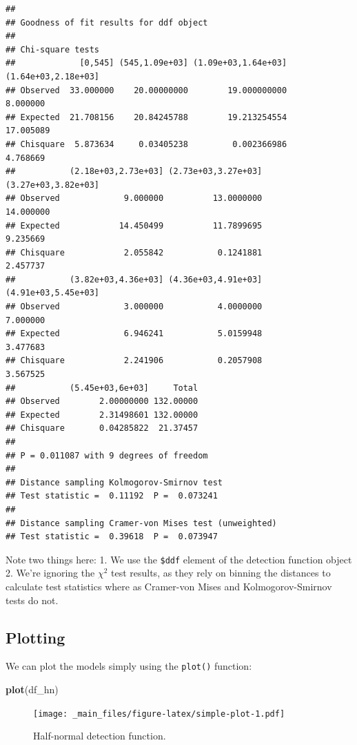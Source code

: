 \documentclass[]{book}
\newenvironment{Shaded}{\begin{snugshade}}{\end{snugshade}}
\newcommand{\KeywordTok}[1]{\textcolor[rgb]{0.13,0.29,0.53}{\textbf{#1}}}
\newcommand{\NormalTok}[1]{#1}
\theoremstyle{definition}
\theoremstyle{definition}
\theoremstyle{remark}
\begin{document}
\begin{verbatim}
## 
## Goodness of fit results for ddf object
## 
## Chi-square tests
##             [0,545] (545,1.09e+03] (1.09e+03,1.64e+03] (1.64e+03,2.18e+03]
## Observed  33.000000    20.00000000        19.000000000            8.000000
## Expected  21.708156    20.84245788        19.213254554           17.005089
## Chisquare  5.873634     0.03405238         0.002366986            4.768669
##           (2.18e+03,2.73e+03] (2.73e+03,3.27e+03] (3.27e+03,3.82e+03]
## Observed             9.000000          13.0000000           14.000000
## Expected            14.450499          11.7899695            9.235669
## Chisquare            2.055842           0.1241881            2.457737
##           (3.82e+03,4.36e+03] (4.36e+03,4.91e+03] (4.91e+03,5.45e+03]
## Observed             3.000000           4.0000000            7.000000
## Expected             6.946241           5.0159948            3.477683
## Chisquare            2.241906           0.2057908            3.567525
##           (5.45e+03,6e+03]     Total
## Observed        2.00000000 132.00000
## Expected        2.31498601 132.00000
## Chisquare       0.04285822  21.37457
## 
## P = 0.011087 with 9 degrees of freedom
## 
## Distance sampling Kolmogorov-Smirnov test
## Test statistic =  0.11192  P =  0.073241 
## 
## Distance sampling Cramer-von Mises test (unweighted)
## Test statistic =  0.39618  P =  0.073947
\end{verbatim}

Note two things here: 1. We use the \texttt{\$ddf} element of the
detection function object 2. We're ignoring the \(\chi^2\) test results,
as they rely on binning the distances to calculate test statistics where
as Cramer-von Mises and Kolmogorov-Smirnov tests do not.

\subsection{Plotting}\label{plotting}

We can plot the models simply using the \texttt{plot()} function:

\begin{Shaded}
\begin{Highlighting}[]
\KeywordTok{plot}\NormalTok{(df_hn)}
\end{Highlighting}
\end{Shaded}

\begin{figure}
\centering
\texttt{[image: \_main\_files/figure-latex/simple-plot-1.pdf]}
\caption{\label{fig:simple-plot}Half-normal detection function.}
\end{figure}
\end{document}
